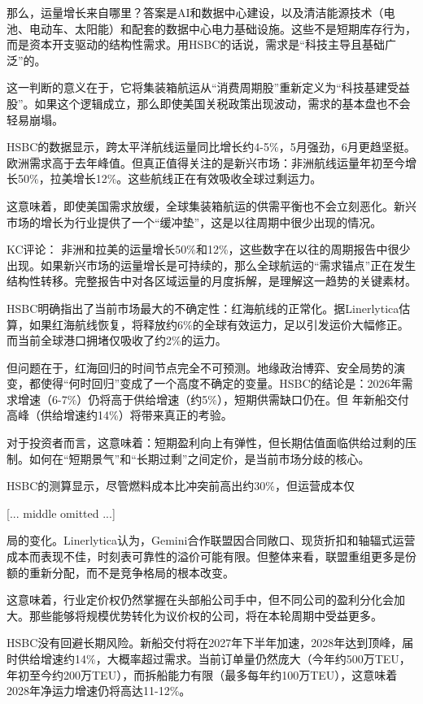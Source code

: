 \documentclass[11pt]{ctexart}
\begin{document}
那么，运量增长来自哪里？答案是AI和数据中心建设，以及清洁能源技术（电池、电动车、太阳能）和配套的数据中心电力基础设施。这些不是短期库存行为，而是资本开支驱动的结构性需求。用HSBC的话说，需求是“科技主导且基础广泛”的。

这一判断的意义在于，它将集装箱航运从“消费周期股”重新定义为“科技基建受益股”。如果这个逻辑成立，那么即使美国关税政策出现波动，需求的基本盘也不会轻易崩塌。

HSBC的数据显示，跨太平洋航线运量同比增长约4-5\%，5月强劲，6月更趋坚挺。欧洲需求高于去年峰值。但真正值得关注的是新兴市场：非洲航线运量年初至今增长50\%，拉美增长12\%。这些航线正在有效吸收全球过剩运力。

这意味着，即使美国需求放缓，全球集装箱航运的供需平衡也不会立刻恶化。新兴市场的增长为行业提供了一个“缓冲垫”，这是以往周期中很少出现的情况。

KC评论： 非洲和拉美的运量增长50\%和12\%，这些数字在以往的周期报告中很少出现。如果新兴市场的运量增长是可持续的，那么全球航运的“需求锚点”正在发生结构性转移。完整报告中对各区域运量的月度拆解，是理解这一趋势的关键素材。

HSBC明确指出了当前市场最大的不确定性：红海航线的正常化。据Linerlytica估算，如果红海航线恢复，将释放约6\%的全球有效运力，足以引发运价大幅修正。而当前全球港口拥堵仅吸收了约2\%的运力。

但问题在于，红海回归的时间节点完全不可预测。地缘政治博弈、安全局势的演变，都使得“何时回归”变成了一个高度不确定的变量。HSBC的结论是：2026年需求增速（6-7\%）仍将高于供给增速（约5\%），短期供需缺口仍在。但 年新船交付高峰（供给增速约14\%）将带来真正的考验。

对于投资者而言，这意味着：短期盈利向上有弹性，但长期估值面临供给过剩的压制。如何在“短期景气”和“长期过剩”之间定价，是当前市场分歧的核心。

HSBC的测算显示，尽管燃料成本比冲突前高出约30\%，但运营成本仅

[... middle omitted ...]

局的变化。Linerlytica认为，Gemini合作联盟因合同敞口、现货折扣和轴辐式运营成本而表现不佳，时刻表可靠性的溢价可能有限。但整体来看，联盟重组更多是份额的重新分配，而不是竞争格局的根本改变。

这意味着，行业定价权仍然掌握在头部船公司手中，但不同公司的盈利分化会加大。那些能够将规模优势转化为议价权的公司，将在本轮周期中受益更多。

HSBC没有回避长期风险。新船交付将在2027年下半年加速，2028年达到顶峰，届时供给增速约14\%，大概率超过需求。当前订单量仍然庞大（今年约500万TEU，年初至今约200万TEU），而拆船能力有限（最多每年约100万TEU），这意味着2028年净运力增速仍将高达11-12\%。
\end{document}
